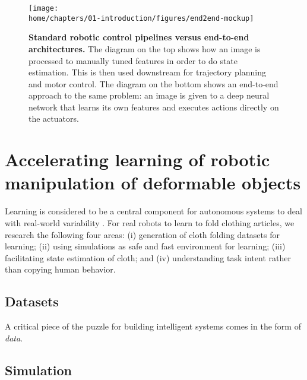 \documentclass[\home/main.tex]{subfiles}
\begin{document}


\begin{figure}[htpb]
    \texttt{[image: \\home/chapters/01-introduction/figures/end2end-mockup]}
    \caption{\textbf{Standard robotic control pipelines versus end-to-end architectures.} The diagram on the top shows how an image is processed to manually tuned features in order to do state estimation. This is then used downstream for trajectory planning and motor control. The diagram on the bottom shows an end-to-end approach to the same problem: an image is given to a deep neural network that learns its own features and executes actions directly on the actuators.}
    \label{fig:intro_end2end}
\end{figure}

\section{Accelerating learning of robotic manipulation of deformable objects}
Learning is considered to be a central component for autonomous systems to deal with real-world variability \autocite{kroemer2021review}. For real robots to learn to fold clothing articles, we research the following four areas:
 (i) generation of cloth folding datasets for learning;
 (ii) using simulations as safe and fast environment for learning; 
 (iii) facilitating state estimation of cloth; and
 (iv) understanding task intent rather than copying human behavior.

\subsection{Datasets}
A critical piece of the puzzle for building intelligent systems comes in the form of \emph{data}. 
\subsection{Simulation}
\end{document}
